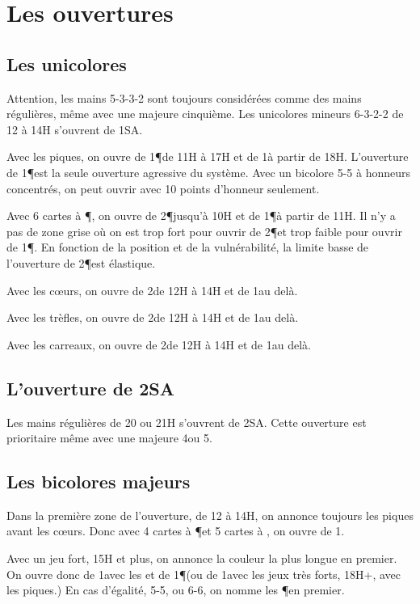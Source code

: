 \chapter{Les ouvertures}


\begin{multicols}{2}


\section*{Les  unicolores}


Attention, les mains 5-3-3-2 sont toujours considérées comme des mains régulières, même avec une majeure cinquième.
Les unicolores mineurs 6-3-2-2 de 12 à 14H s'ouvrent de 1SA.

Avec les piques, on ouvre de 1\P de 11H à 17H et de 1\K à partir de 18H. L'ouverture de 1\P est la seule ouverture agressive du système.
Avec un bicolore 5-5 à honneurs concentrés, on peut ouvrir avec 10 points d'honneur seulement.

Avec 6 cartes à \P, on ouvre de 2\P jusqu'à 10H et de 1\P à partir de  11H. Il n'y a pas de zone grise où on est trop fort pour ouvrir de 2\P et trop faible pour ouvrir de 1\P. En fonction de la position et de la vulnérabilité, la limite basse de l'ouverture de 2\P est élastique.

Avec les cœurs, on ouvre de 2\C de 12H à 14H et de 1\T au delà.

Avec les trèfles, on ouvre de 2\T de 12H à 14H et de 1\C au delà.


Avec les carreaux, on ouvre de 2\K de 12H à 14H et de 1\C au delà.

\section*{L'ouverture de 2SA}

Les mains régulières de 20 ou 21H s'ouvrent de 2SA. Cette ouverture est prioritaire même avec une majeure 4\ieme ou 5\ieme.

\section*{Les bicolores majeurs}

Dans la première zone de l'ouverture, de 12 à 14H, on annonce toujours les piques avant les cœurs. Donc avec 4 cartes à \P et 5 cartes à \C, on ouvre de 1\K.

Avec un jeu fort, 15H et plus, on annonce la couleur la plus longue en premier. On ouvre donc de 1\T avec les \C et de 1\P (ou de 1\K avec les jeux très forts, 18H+, avec les piques.)
En cas d'égalité, 5-5, ou 6-6, on nomme les \P en premier.


\end{multicols}
